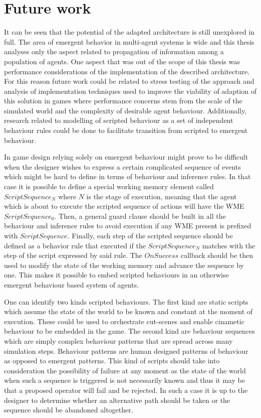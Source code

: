 \section{Future work}

It can be seen that the potential of the adapted architecture is still unexplored in full.
The area of emergent behavior in multi-agent systems is wide and this thesis analyses only the aspect related to propagation of information among a population of agents.
One aspect that was out of the scope of this thesis was performance considerations of the implementation of the described architecture.
For this reason future work could be related to stress testing of the approach and analysis of implementation techniques used to improve the viability of adaption of this solution in games where performance concerns stem from the scale of the simulated world and the complexity of desirable agent behaviour.
Additionally, research related to modelling of scripted behaviour as a set of independent behaviour rules could be done to facilitate transition from scripted to emergent behaviour.

In game design relying solely on emergent behaviour might prove to be difficult when the designer wishes to express a certain complicated sequence of events which might be hard to define in terms of behaviour and inference rules.
In that case it is possible to define a special working memory element called $ScriptSequence_N$ where $N$ is the stage of execution, meaning that the agent which is about to execute the scripted sequence of actions will have the WME $ScriptSequence_0$.
Then, a general guard clause should be built in all the behaviour and inference rules to avoid execution if any WME present is prefixed with $ScriptSequence$.
Finally, each step of the scripted sequence should be defined as a behavior rule that executed if the $ScriptSequence_N$ matches with the step of the script expressed by said rule.
The $OnSuccess$ callback should be then used to modify the state of the working memory and advance the sequence by one.
This makes it possible to embed scripted behaviours in an otherwise emergent behaviour based system of agents.

One can identify two kinds scripted behaviours.
The first kind are static scripts which assume the state of the world to be known and constant at the moment of execution.
These could be used to orchestrate cut-scenes and enable cinametic behaviour to be embedded in the game.
The second kind are behaviour sequences which are simply complex behaviour patterns that are spread across many simulation steps.
Behaviour patterns are human designed patterns of behaviour as opposed to emergent patterns.
This kind of scripts should take into consideration the possibility of failure at any moment as the state of the world when such a sequence is triggered is not necessarily known and thus it may be that a proposed operator will fail and be rejected.
In such a case it is up to the designer to determine whether an alternative path should be taken or the sequence should be abandoned altogether.

